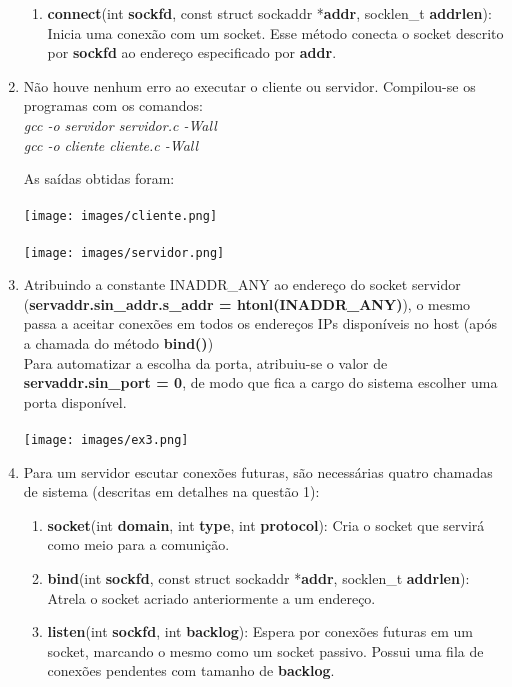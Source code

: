 \documentclass[12pt,a4paper]{report}
\begin{document}
\begin{enumerate}
\begin{enumerate}
        \item \textbf{connect}(int \textbf{sockfd}, const struct sockaddr *\textbf{addr}, socklen\_t \textbf{addrlen}): Inicia uma conexão com um socket. Esse método conecta o socket descrito por \textbf{sockfd} ao endereço especificado por \textbf{addr}.
   \end{enumerate}
   
   \item Não houve nenhum erro ao executar o cliente ou servidor. Compilou-se os programas com os comandos:\\
   \textit{gcc -o servidor servidor.c -Wall}\\
   \textit{gcc -o cliente cliente.c -Wall}
   
   As saídas obtidas foram:\\\\
   \texttt{[image: images/cliente.png]}\\\\
   \texttt{[image: images/servidor.png]}
   
   \item Atribuindo a constante INADDR\_ANY ao endereço do socket servidor (\textbf{servaddr.sin\_addr.s\_addr = htonl(INADDR\_ANY)}), o mesmo passa a aceitar conexões em todos os endereços IPs disponíveis no host (após a chamada do método \textbf{bind()})
   \\
   Para automatizar a escolha da porta, atribuiu-se o valor de \textbf{servaddr.sin\_port = 0}, de modo que fica a cargo do sistema escolher uma porta disponível.
   \\
   \\
   \texttt{[image: images/ex3.png]}

 
   \item Para um servidor escutar conexões futuras, são necessárias quatro chamadas de sistema (descritas em detalhes na questão 1):
    \begin{enumerate}
        \item \textbf{socket}(int \textbf{domain}, int \textbf{type}, int \textbf{protocol}): Cria o socket que servirá como meio para a comunição.
        
        \item \textbf{bind}(int \textbf{sockfd}, const struct sockaddr *\textbf{addr}, socklen\_t \textbf{addrlen}): Atrela o socket acriado anteriormente a um endereço.

        \item \textbf{listen}(int \textbf{sockfd}, int \textbf{backlog}): Espera por conexões futuras em um socket, marcando o mesmo como um socket passivo. Possui uma fila de conexões pendentes com tamanho de \textbf{backlog}.
        

\end{enumerate}
\end{enumerate}
\end{document}
